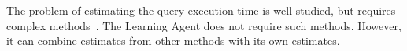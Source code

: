 The problem of estimating the query execution time is well-studied, but requires complex methods~\cite{duggan2011performance, wu2013towards, li2012gslpi, 
chaudhuri2004estimating}. 
The Learning Agent does not require such methods. 
However, it can combine estimates from other methods with its own estimates.
